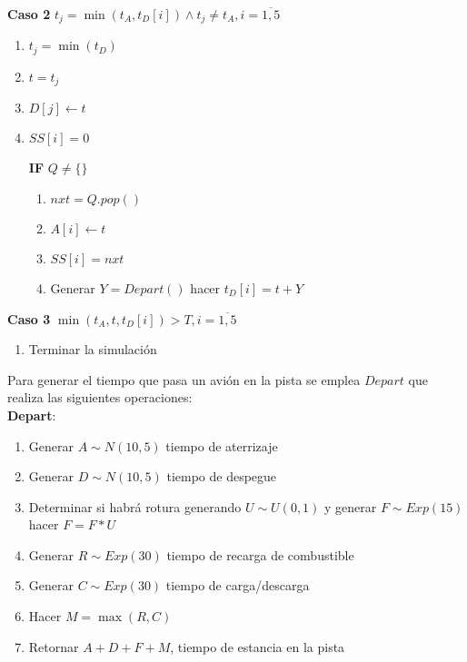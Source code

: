 \documentclass[a4paper,10pt,twocolumn]{article}
\begin{document}
		\textbf{Caso 2} $ t_{j} = \min{( t_{A}, t_{D}[i] )} \wedge t_{j} \neq t_{A}, i = \overline{1,5}$
		
		\begin{enumerate}
			\item[] $t_{j} = \min(t_{D})$
			\item[] $t = t_{j}$
			\item[] $D[j] \leftarrow t$
			\item[] $SS[i] = 0$
			
			\textbf{IF} $Q \neq \{\}$
				\begin{enumerate}
					\item[] $nxt = Q.pop()$
					\item[] $A[i] \leftarrow t$
					\item[] $SS[i] = nxt$
					\item[] Generar $Y = Depart()$ hacer $t_{D}[i] = t + Y$ 
				\end{enumerate} 
		\end{enumerate}
		
		\textbf{Caso 3} $ \min{( t_{A}, t, t_{D}[i] )} > T, i = \overline{1,5}$
		
		\begin{enumerate}
			\item[] Terminar la simulaci\'on 
		\end{enumerate}
		
		Para generar el tiempo que pasa un avi\'on en la pista se emplea $Depart$ que realiza las siguientes operaciones:\\
		
		\textbf{Depart}:
		\begin{enumerate}
			\item[] Generar $A \sim N(10,5)$ tiempo de aterrizaje
			\item[] Generar $D \sim N(10,5)$ tiempo de despegue
			\item[] Determinar si habr\'a rotura generando $U \sim U(0,1)$ y generar $F \sim Exp(15)$ hacer $F = F * U$
			\item[] Generar $R \sim Exp(30)$ tiempo de recarga de combustible
			\item[] Generar $C \sim Exp(30)$ tiempo de carga/descarga
			\item[] Hacer $M = \max{(R, C)}$
			\item[] Retornar $A + D + F + M$, tiempo de estancia en la pista
		\end{enumerate}

\end{document}
